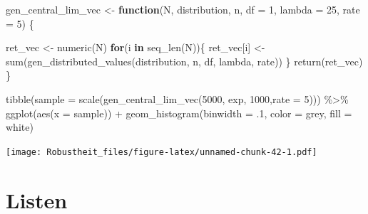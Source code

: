 \documentclass[
]{book}
\newenvironment{Shaded}{\begin{snugshade}}{\end{snugshade}}
\newcommand{\AttributeTok}[1]{\textcolor[rgb]{0.77,0.63,0.00}{#1}}
\newcommand{\ControlFlowTok}[1]{\textcolor[rgb]{0.13,0.29,0.53}{\textbf{#1}}}
\newcommand{\DecValTok}[1]{\textcolor[rgb]{0.00,0.00,0.81}{#1}}
\newcommand{\FunctionTok}[1]{\textcolor[rgb]{0.00,0.00,0.00}{#1}}
\newcommand{\NormalTok}[1]{#1}
\newcommand{\OtherTok}[1]{\textcolor[rgb]{0.56,0.35,0.01}{#1}}
\newcommand{\SpecialCharTok}[1]{\textcolor[rgb]{0.00,0.00,0.00}{#1}}
\newcommand{\StringTok}[1]{\textcolor[rgb]{0.31,0.60,0.02}{#1}}
\begin{document}
\begin{Shaded}
\begin{Highlighting}[]
\NormalTok{gen\_central\_lim\_vec }\OtherTok{\textless{}{-}} \ControlFlowTok{function}\NormalTok{(N, }
\NormalTok{                                distribution,}
\NormalTok{                                n,}
                                \AttributeTok{df =} \DecValTok{1}\NormalTok{,}
                                \AttributeTok{lambda =} \DecValTok{25}\NormalTok{,}
                                \AttributeTok{rate =} \DecValTok{5}\NormalTok{) \{}
  
\NormalTok{  ret\_vec }\OtherTok{\textless{}{-}} \FunctionTok{numeric}\NormalTok{(N)}
  \ControlFlowTok{for}\NormalTok{(i }\ControlFlowTok{in} \FunctionTok{seq\_len}\NormalTok{(N))\{}
\NormalTok{    ret\_vec[i] }\OtherTok{\textless{}{-}} \FunctionTok{sum}\NormalTok{(}\FunctionTok{gen\_distributed\_values}\NormalTok{(distribution,}
\NormalTok{                                      n,}
\NormalTok{                                      df,}
\NormalTok{                                      lambda,}
\NormalTok{                                      rate))}
\NormalTok{  \}}
  \FunctionTok{return}\NormalTok{(ret\_vec)}
\NormalTok{\}}

\FunctionTok{tibble}\NormalTok{(}\AttributeTok{sample =} \FunctionTok{scale}\NormalTok{(}\FunctionTok{gen\_central\_lim\_vec}\NormalTok{(}\DecValTok{5000}\NormalTok{, }\StringTok{\textquotesingle{}exp\textquotesingle{}}\NormalTok{, }\DecValTok{1000}\NormalTok{,}\AttributeTok{rate =} \DecValTok{5}\NormalTok{))) }\SpecialCharTok{\%\textgreater{}\%} 
  \FunctionTok{ggplot}\NormalTok{(}\FunctionTok{aes}\NormalTok{(}\AttributeTok{x =}\NormalTok{ sample)) }\SpecialCharTok{+}
  \FunctionTok{geom\_histogram}\NormalTok{(}\AttributeTok{binwidth =}\NormalTok{ .}\DecValTok{1}\NormalTok{,}
                 \AttributeTok{color =} \StringTok{\textquotesingle{}grey\textquotesingle{}}\NormalTok{,}
                 \AttributeTok{fill =} \StringTok{\textquotesingle{}white\textquotesingle{}}\NormalTok{)}
\end{Highlighting}
\end{Shaded}

\texttt{[image: Robustheit\_files/figure-latex/unnamed-chunk-42-1.pdf]}

\hypertarget{listen}{%
\chapter{Listen}\label{listen}}
\end{document}
